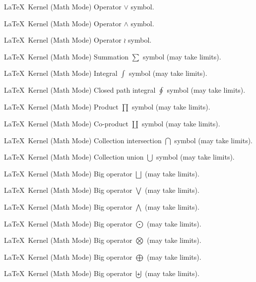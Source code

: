 %
 {}%
 {\LaTeX\ Kernel (Math Mode)}%
 {Operator \ensuremath{\vee} symbol.}%
 {}

%
 {}%
 {\LaTeX\ Kernel (Math Mode)}%
 {Operator \ensuremath{\wedge} symbol.}%
 {}

%
 {}%
 {\LaTeX\ Kernel (Math Mode)}%
 {Operator \ensuremath{\wr} symbol.}%
 {}

%
 {}%
 {\LaTeX\ Kernel (Math Mode)}%
 {Summation \ensuremath{\sum} symbol (may take limits).}%
 {}

%
 {}%
 {\LaTeX\ Kernel (Math Mode)}%
 {Integral \ensuremath{\int} symbol (may take limits).}%
 {}

%
 {}%
 {\LaTeX\ Kernel (Math Mode)}%
 {Closed path integral \ensuremath{\oint} symbol (may take limits).}%
 {}

%
 {}%
 {\LaTeX\ Kernel (Math Mode)}%
 {Product \ensuremath{\prod} symbol (may take limits).}%
 {}

%
 {}%
 {\LaTeX\ Kernel (Math Mode)}%
 {Co-product \ensuremath{\coprod} symbol (may take limits).}%
 {}

%
 {}%
 {\LaTeX\ Kernel (Math Mode)}%
 {Collection intersection \ensuremath{\bigcap} symbol (may take limits).}%
 {}

%
 {}%
 {\LaTeX\ Kernel (Math Mode)}%
 {Collection union \ensuremath{\bigcup} symbol (may take limits).}%
 {}

%
 {}%
 {\LaTeX\ Kernel (Math Mode)}%
 {Big operator \ensuremath{\bigsqcup} (may take limits).}%
 {}

%
 {}%
 {\LaTeX\ Kernel (Math Mode)}%
 {Big operator \ensuremath{\bigvee} (may take limits).}%
 {}

%
 {}%
 {\LaTeX\ Kernel (Math Mode)}%
 {Big operator \ensuremath{\bigwedge} (may take limits).}%
 {}

%
 {}%
 {\LaTeX\ Kernel (Math Mode)}%
 {Big operator \ensuremath{\bigodot} (may take limits).}%
 {}

%
 {}%
 {\LaTeX\ Kernel (Math Mode)}%
 {Big operator \ensuremath{\bigotimes} (may take limits).}%
 {}

%
 {}%
 {\LaTeX\ Kernel (Math Mode)}%
 {Big operator \ensuremath{\bigoplus} (may take limits).}%
 {}

%
 {}%
 {\LaTeX\ Kernel (Math Mode)}%
 {Big operator \ensuremath{\biguplus} (may take limits).}%
 {}

